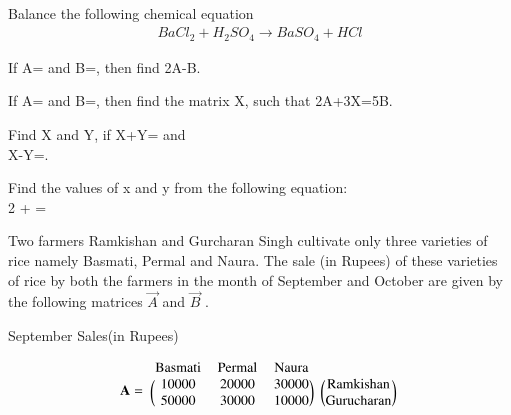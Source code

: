 \item Balance the following chemical equation
\begin{align}\label{1}
    BaCl_2 + H_2SO_4 \xrightarrow{} BaSO_4 + HCl
\end{align}
    \item If A= and B=, then find 2A-B.\\
    \item If A= and B=, then find the matrix X, such that 2A+3X=5B.\\
    \item Find X and Y, if X+Y= and \\X-Y=.\\
    \item Find the values of x and y from the following equation:\\
    2 +  = \\
     
    

\item     Two farmers Ramkishan and Gurcharan Singh cultivate only three varieties of rice namely Basmati, Permal and Naura. The sale (in Rupees) of these varieties of rice by both the farmers in the month of September and October are given by the following matrices $\vec{A}$ and $\vec{B}$ .

\begin{center}
September Sales(in Rupees)
\end{center}
\begin{align}
    \vec{A}=
    \begin{blockarray}{cccc}
    \text{Basmati} & \text{Permal} & \text{Naura} \\
    \begin{block}{(ccc)(c)}
    10000 & 20000 & 30000 & \text{Ramkishan}\\
    50000 & 30000 & 10000 & \text{Gurucharan} \\
    \end{block}
    \end{blockarray}
\end{align}

